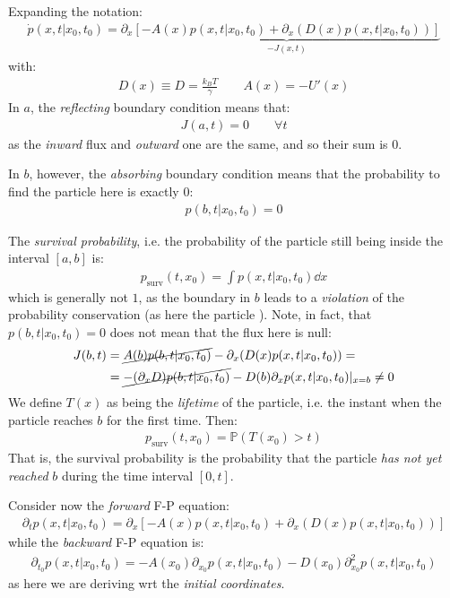 \documentclass[../template.tex]{subfiles}
\begin{document}
Expanding the notation:
\begin{align*}
    \dot{p}(x,t|x_0,t_0) = \partial_x\underbrace{[-A(x) p(x,t|x_0,t_0) + \partial_x(D(x) p(x,t|x_0,t_0))]}_{-J(x,t)} 
\end{align*}
with:
\begin{align*}
    D(x) \equiv D = \frac{k_B T}{\gamma}  \qquad A(x) = -U'(x)
\end{align*}
In $a$, the \textit{reflecting} boundary condition means that:
\begin{align*}
    J(a,t) = 0 \qquad \forall t
\end{align*}  
as the \textit{inward} flux and \textit{outward} one are the same, and so their sum is $0$.

In $b$, however, the \textit{absorbing} boundary condition means that the probability to find the particle here is exactly $0$:
\begin{align*}
    p(b,t|x_0,t_0) = 0
\end{align*}   

The \textit{survival probability}, i.e. the probability of the particle still being inside the interval $[a,b]$ is:
\begin{align*}
    p_{\mathrm{surv} }(t,x_0) = \int p(x,t|x_0,t_0) \dd{x}
\end{align*}  
which is generally not $1$, as the boundary in $b$ leads to a \textit{violation} of the probability conservation (as here the particle ). Note, in fact, that $p(b,t|x_0,t_0) = 0$ does not mean that the flux here is null:
\begin{align*}
    J(b,t) &= \cancel{A(b) p(b,t|x_0,t_0)} - \partial_x(D(x) p(x,t|x_0,t_0)) = \\
    &= \cancel{-(\partial_x D) p(b,t|x_0,t_0) }- D(b) \partial_x p(x,t|x_0,t_0)|_{x = b} \neq 0
\end{align*}    
We define $T(x)$ as being the \textit{lifetime} of the particle, i.e. the instant when the particle reaches $b$ for the first time. Then:
\begin{align*}
    p_{\mathrm{surv} }(t, x_0) = \mathbb{P}(T(x_0) > t)
\end{align*}   
That is, the survival probability is the probability that the particle \textit{has not yet reached} $b$ during the time interval $[0,t]$. 

Consider now the \textit{forward} F-P equation:
\begin{align*}
    \partial_t p(x,t|x_0,t_0) = \partial_x [-A(x) p (x,t|x_0,t_0) + \partial_x (D(x)p(x,t|x_0,t_0))]
\end{align*} 
while the \textit{backward} F-P equation is:
\begin{align*}
    \partial_{t_0} p(x,t|x_0,t_0) = -A(x_0) \partial_{x_0} p(x,t|x_0,t_0) - D(x_0) \partial_{x_0}^2 p(x,t|x_0,t_0)
\end{align*} 
as here we are deriving wrt the \textit{initial coordinates}.  
\end{document}
